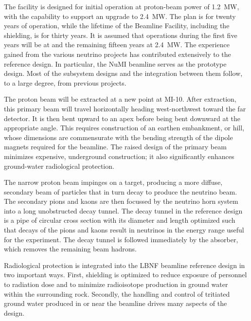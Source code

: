 The facility is designed for initial operation at proton-beam power of \SI{1.2}{\MW}, with the capability to support an upgrade to \SI{2.4}{\MW}. The plan is for twenty years of operation, while the lifetime of the Beamline Facility, including the shielding, is for thirty years. It is 
assumed that operations during the first five years will be at  and the remaining fifteen years at \SI{2.4}{\MW}.  
The experience gained from the various neutrino projects has contributed extensively to the reference design. In particular, the NuMI beamline serves as the prototype design. Most of the subsystem designs and the integration between them follow, to a large degree, from previous projects. 
 
The proton beam will be extracted at a new point at MI-10. After extraction, this primary beam will travel horizontally heading west-northwest toward 
the far detector. It is then 
bent upward to an apex before being bent downward at the appropriate angle. 
This requires construction of an earthen embankment, or hill, whose dimensions are commensurate with the bending strength of the dipole magnets required for the beamline. 
The raised design of the primary beam 
minimizes expensive, underground construction; it also significantly enhances ground-water radiological protection. 
 
The narrow proton beam impinges on a target, producing a more diffuse, secondary beam of particles that in turn decay to produce the neutrino beam. 
The secondary pions and kaons are then focussed by the neutrino horn system into a long unobstructed decay tunnel. 
The decay tunnel in the reference design is a pipe of circular cross section with its 
diameter and length optimized such that decays of the pions and kaons result in neutrinos in the energy range useful for the experiment. 
The decay tunnel is followed immediately by the absorber, which removes the remaining beam hadrons. 
 
Radiological protection is integrated into the LBNF beamline reference design in two important ways. First, shielding is optimized to reduce exposure of personnel to radiation dose and to minimize radioisotope production in ground water within the surrounding rock. Secondly, the handling and control of tritiated ground water produced in or near the beamline drives many aspects of the design. 
 
